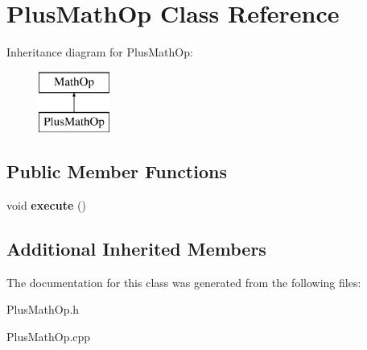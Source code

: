 \hypertarget{class_plus_math_op}{}\section{Plus\+Math\+Op Class Reference}
\label{class_plus_math_op}
Inheritance diagram for Plus\+Math\+Op\+:\begin{figure}[H]
\begin{center}
\leavevmode
\includegraphics[height=2.000000cm]{class_plus_math_op}
\end{center}
\end{figure}
\subsection*{Public Member Functions}
\begin{DoxyCompactItemize}
\item 
\hypertarget{class_plus_math_op_af4a0c7be45556dc4c7c78011626ede7b}{}void {\bfseries execute} ()\label{class_plus_math_op_af4a0c7be45556dc4c7c78011626ede7b}

\end{DoxyCompactItemize}
\subsection*{Additional Inherited Members}


The documentation for this class was generated from the following files\+:\begin{DoxyCompactItemize}
\item 
Plus\+Math\+Op.\+h\item 
Plus\+Math\+Op.\+cpp\end{DoxyCompactItemize}
